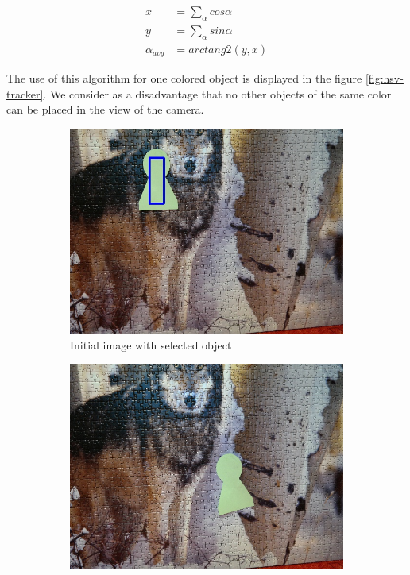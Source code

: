 $$
\begin{aligned}
x &= \sum_\alpha cos \alpha \\
y &= \sum_\alpha sin \alpha \\
\alpha_{avg} &= arctang2(y, x)
\end{aligned}
$$

The use of this algorithm for one colored object is displayed in the figure
\ref{fig:hsv-tracker}. We consider as a disadvantage that no other objects of
the same color can be placed in the view of the camera.

\begin{figure}
  \centering
  \begin{subfigure}[b]{0.48\linewidth}
    \includegraphics[width=\linewidth]{img/hsv/initial.jpg}
    \caption{Initial image with selected object}
  \end{subfigure}
  \begin{subfigure}[b]{0.48\linewidth}
    \includegraphics[width=\linewidth]{img/hsv/object.jpg}

\end{subfigure}
\end{figure}
